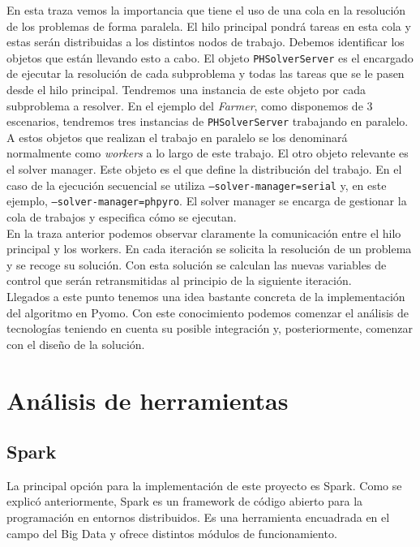 En esta traza vemos la importancia que tiene el uso de una cola en la resolución de los problemas de forma paralela. El hilo principal pondrá tareas en esta cola y estas serán distribuidas a los distintos nodos de trabajo. Debemos identificar los objetos que están llevando esto a cabo. El objeto \texttt{PHSolverServer} es el encargado de ejecutar la resolución de cada subproblema y todas las tareas que se le pasen desde el hilo principal. Tendremos una instancia de este objeto por cada subproblema a resolver. En el ejemplo del \textit{Farmer}, como disponemos de 3 escenarios, tendremos tres instancias de \texttt{PHSolverServer} trabajando en paralelo. A estos objetos que realizan el trabajo en paralelo se los denominará normalmente como \textit{workers} a lo largo de este trabajo. El otro objeto relevante es el solver manager. Este objeto es el que define la distribución del trabajo. En el caso de la ejecución secuencial se utiliza \texttt{--solver-manager=serial} y, en este ejemplo, \texttt{--solver-manager=phpyro}. El solver manager se encarga de gestionar la cola de trabajos y especifica cómo se ejecutan.\\

En la traza anterior podemos observar claramente la comunicación entre el hilo principal y los workers. En cada iteración se solicita la resolución de un problema y se recoge su solución. Con esta solución se calculan las nuevas variables de control que serán retransmitidas al principio de la siguiente iteración. \\

Llegados a este punto tenemos una idea bastante concreta de la implementación del algoritmo en Pyomo. Con este conocimiento podemos comenzar el análisis de tecnologías teniendo en cuenta su posible integración y, posteriormente, comenzar con el diseño de la solución.

\section{Análisis de herramientas}

\subsection{Spark}


La principal opción para la implementación de este proyecto es Spark. Como se explicó anteriormente, Spark es un framework de código abierto para la programación en entornos distribuidos. Es una herramienta encuadrada en el campo del Big Data y ofrece distintos módulos de funcionamiento.\\

